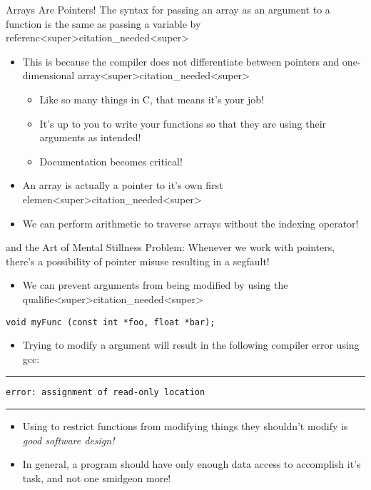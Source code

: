 \documentclass[11pt]{beamer}
\let\OldTexttt\texttt
\renewcommand{\texttt}[1]{\OldTexttt{\color{teal}{#1}}}
\begin{document}
\begin{frame}{Arrays Are Pointers!}
The syntax for passing an array as an argument to a function is the same as passing a variable by referenc<super>citation_needed<super>  
\begin{itemize}
\item This is because the compiler does not differentiate between pointers and one-dimensional array<super>citation_needed<super>  
\begin{itemize}
\item Like so many things in C, that means it's your job! 
\item It's up to you to write your functions so that they are using their arguments as intended!  
\item Documentation becomes critical!
\end{itemize}
\item An array is actually a pointer to it's own first elemen<super>citation_needed<super>
\item We can perform arithmetic to traverse arrays without the indexing operator! 
\end{itemize}
\end{frame}

\begin{frame}[fragile=singleslide]{\texttt{const} and the Art of Mental Stillness}
Problem: Whenever we work with pointers, there's a possibility of pointer misuse resulting in a segfault! 
\begin{itemize}
\item We can prevent arguments from being modified by using the \texttt{const} qualifie<super>citation_needed<super>
\end{itemize}
\begin{lstlisting}[style=C]
void myFunc (const int *foo, float *bar);
\end{lstlisting}
\begin{itemize}
\item Trying to modify a \texttt{const} argument will result in the following compiler error using gcc:
\end{itemize}
\hrule
\begin{verbatim}
error: assignment of read-only location 
\end{verbatim}
\hrule
\begin{itemize}
\item Using \texttt{const} to restrict functions from modifying things they shouldn't modify is \emph{good software design!}
\item In general, a program should have only enough data access to accomplish it's task, and not one smidgeon more! 
\end{itemize}
\end{frame}
\end{document}
